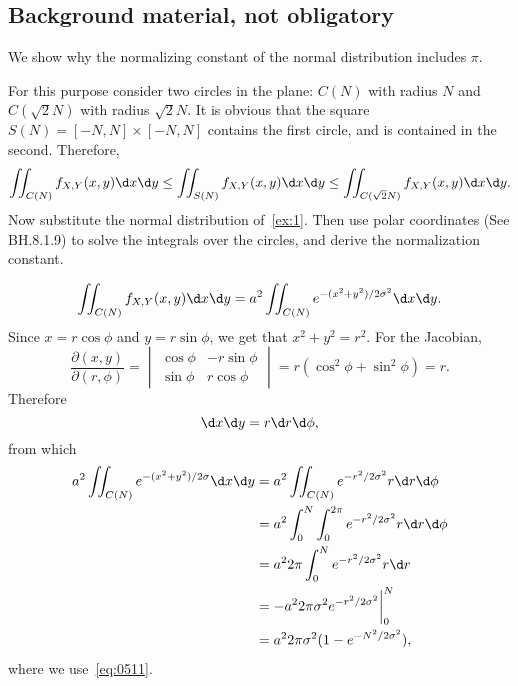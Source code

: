 \subsection{Background material, not obligatory}
\label{sec:backgr-mater-not-1}



We show why the normalizing constant of the normal distribution includes $\pi$.

\begin{exercise}\label{ex:2}
For this purpose consider two circles in the plane: $C(N)$ with radius $N$ and $C(\sqrt 2 N)$ with radius $\sqrt 2 N$.
It is obvious that the square $S(N) = [-N,N]\times[-N,N]$ contains the first circle, and is contained in the second.
Therefore,
\begin{equation}
  \label{eq:0513}
  \iint_{C(N)}f_{X,Y}(x,y) \d x\d y \leq
  \iint_{S(N)}f_{X,Y}(x,y) \d x\d y \leq
  \iint_{C(\sqrt 2 N)}f_{X,Y}(x,y) \d x\d y.
\end{equation}
Now substitute the normal distribution of~\cref{ex:1}.
Then use polar coordinates (See BH.8.1.9) to solve the integrals over the circles, and derive the normalization constant.
\begin{solution}
\begin{equation}
\label{eq:0514}
  \iint_{C(N)}f_{X,Y}(x,y) \d x\d y =
a^{2}  \iint_{C(N)} e^{-(x^{2}+y^{2})/2\sigma^2} \d x\d y.
\end{equation}
Since  $x = r \cos \phi$ and $y=r\sin \phi$, we get that $x^2+y^2 = r^{2}$. For the Jacobian,
\begin{equation}
  \label{eq:0515}
  \frac{\partial(x, y)}{\partial(r,\phi)} =
  \begin{vmatrix}
    \cos \phi  & -r\sin \phi \\
    \sin \phi  & r\cos \phi
  \end{vmatrix}
= r(\cos^{2} \phi + \sin^2 \phi) = r.
\end{equation}
Therefore
\begin{equation}
\label{eq:0516}
\d x \d y = r \d r \d \phi,
\end{equation}
from which
\begin{align}
a^{2}  \iint_{C(N)} e^{-(x^{2}+y^{2})/2\sigma} \d x\d y
&=a^{2}  \iint_{C(N)} e^{-r^{2}/2\sigma^{2}} r \d r\d \phi \\
&= a^{2}  \int_{0}^{N} \int_{0}^{2\pi} e^{-r^{2}/2\sigma^{2}} r \d r\d \phi \\
&= a^{2}  2\pi \int_{0}^{N}  e^{-r^{2}/2\sigma^{2}} r \d r \\
&= - a^{2}  2\pi{\sigma^{2}} e^{-r^{2}/2\sigma^{2}}\biggr|_{0}^{N} \\
&= a^{2}2\pi{\sigma^{2}} (1-e^{-N^{2}/2\sigma^{2}}),
\end{align}
where we use~\cref{eq:0511}.



\end{solution}
\end{exercise}
